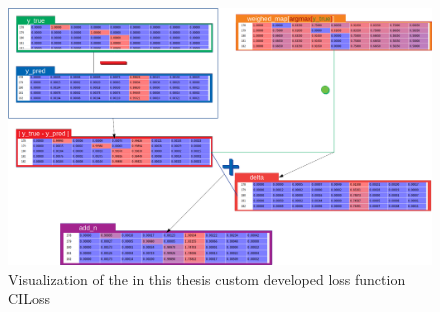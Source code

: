 \begin{figure}[H]
    \centering
    \includegraphics[width=\textwidth,height=\textheight,keepaspectratio]{img/loss_calculation.png}
    \decoRule
    \caption[Loss Functions CILoss: Calculation]{Visualization of the in this thesis custom developed loss function CILoss}
    \label{fig:ciloss-calc}
\end{figure}
